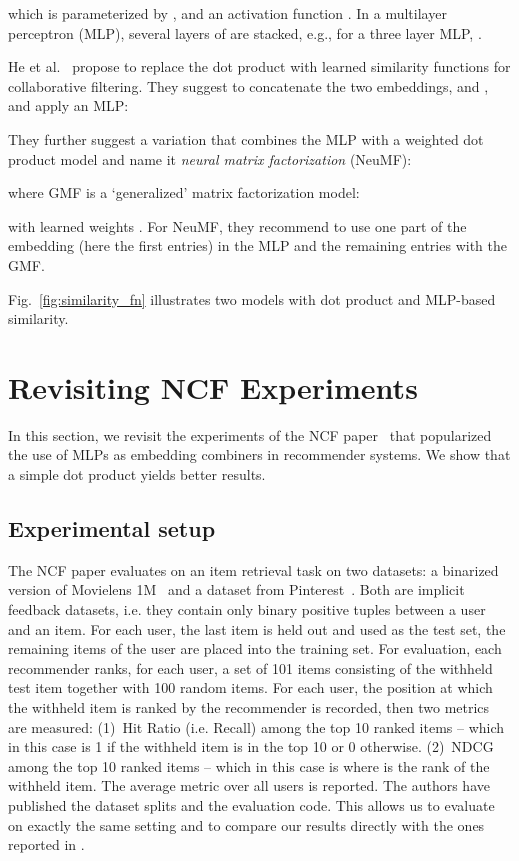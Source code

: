 \documentclass{article}
\begin{document}
which is parameterized by ,  and an activation function .
In a multilayer perceptron (MLP), several layers of  are stacked, e.g., for a three layer MLP, .

He et al.~\cite{he:www17} propose to replace the dot product with learned similarity functions for collaborative filtering.
They suggest to concatenate the two embeddings,  and , and apply an MLP:

They further suggest a variation that combines the MLP with a weighted dot product model and name it \emph{neural matrix factorization} (NeuMF):

where GMF is a `generalized' matrix factorization model:

with learned weights .
For NeuMF, they recommend to use one part of the embedding (here the first  entries) in the MLP and the remaining  entries with the GMF.

Fig.~\ref{fig:similarity_fn} illustrates two models with dot product and MLP-based similarity.


\section{Revisiting NCF Experiments}

In this section, we revisit the experiments of the NCF paper~\cite{he:www17} that popularized the use of MLPs as embedding combiners in recommender systems.
We show that a simple dot product yields better results.

\subsection{Experimental setup}

The NCF paper \cite{he:www17} evaluates on an item retrieval task on two datasets: a binarized version of Movielens 1M~\cite{harper:15} and a dataset from Pinterest~\cite{geng:iccv15}.
Both are implicit feedback datasets, i.e. they contain only binary positive tuples between a user and an item.
For each user, the last item is held out and used as the test set, the remaining items of the user are placed into the training set.
For evaluation, each recommender ranks, for each user, a set of 101 items consisting of the withheld test item together with 100 random items.
For each user, the position at which the withheld item is ranked by the recommender is recorded, then two metrics are measured: (1)~Hit Ratio (i.e. Recall) among the top 10 ranked items -- which in this case is 1 if the withheld item is in the top 10 or 0 otherwise. (2)~NDCG among the top 10 ranked items -- which in this case is  where  is the rank of the withheld item.
The average metric over all users is reported.
The authors have published the dataset splits and the evaluation code.
This allows us to evaluate on exactly the same setting and to compare our results directly with the ones reported in \cite{he:www17}.
\end{document}
